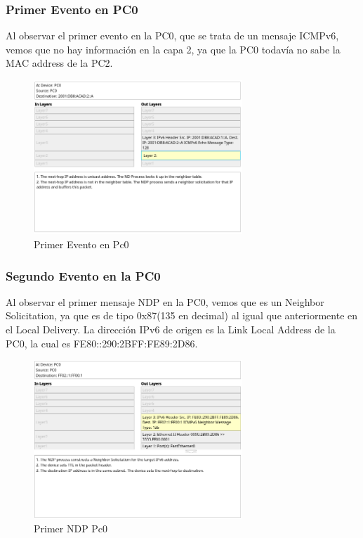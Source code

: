 \documentclass[a4paper,12pt]{article}
\begin{document}
\subsubsection{Primer Evento en PC0}
Al observar el primer evento en la PC0, que se trata de un mensaje ICMPv6, vemos que no hay información en la capa 2, ya que la PC0 todavía no sabe la MAC address de la PC2.\\ 
\bigskip
\begin{figure}[h]
  \centering
  \includegraphics[bb=0 0 400 300, width=0.7\textwidth]{imagenes/ayuda.png}
  \caption{Primer Evento en Pc0}
\end{figure}
\FloatBarrier
\subsubsection{Segundo Evento en la PC0}
Al observar el primer mensaje NDP en la PC0, vemos que es un Neighbor Solicitation, ya que es de tipo 0x87(135 en decimal) al igual que anteriormente en el Local Delivery. La dirección IPv6 de origen es la Link Local Address de la PC0, la cual es FE80::290:2BFF:FE89:2D86.\\
\begin{figure}[h]
    \centering
    \includegraphics[width=0.7\textwidth]{imagenes/2.png}
    \caption{Primer NDP Pc0}
\end{figure}\\
\FloatBarrier
\end{document}
